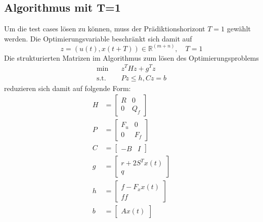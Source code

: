 \documentclass[a4paper,10pt]{scrartcl}
\begin{document}
\subsection{Algorithmus mit T=1}
\label{sec:algorithust1}
Um die test cases lösen zu können, muss der Prädiktionshorizont $T=1$ gewählt werden. Die Optimierungsvariable beschränkt sich damit auf
\begin{equation*}
  z=\left( u(t), x(t+T) \right)\in\mathbb{R}^{(m+n)}, \quad T=1
\end{equation*}
Die strukturierten Matrizen im Algorithmus zum lösen des Optimierungsproblems
\begin{equation*}\begin{split}
  \min \quad &z^{T}Hz+g^{T}z\\
  \text{s.t.} \quad &Pz\leq h,Cz = b 
\end{split}\end{equation*}
reduzieren sich damit auf folgende Form:
\begin{equation*}\begin{split}
  H&=\begin{bmatrix}
  R & 0\\ 
  0 & Q_{f}
  \end{bmatrix}\\
  P&=\begin{bmatrix}
  F_{u} & 0\\ 
  0 & F_{f}
  \end{bmatrix}\\
  C&=\begin{bmatrix}
  -B & I
  \end{bmatrix}\\
  g&=\begin{bmatrix}
  r+2S^{T}x(t)\\ 
  q
  \end{bmatrix}\\
  h&=\begin{bmatrix}
  f-F_{x}x(t)\\ 
  f{f}
  \end{bmatrix}\\
  b&=\begin{bmatrix}
  Ax(t)
  \end{bmatrix}\\
\end{split}\end{equation*}
\end{document}
